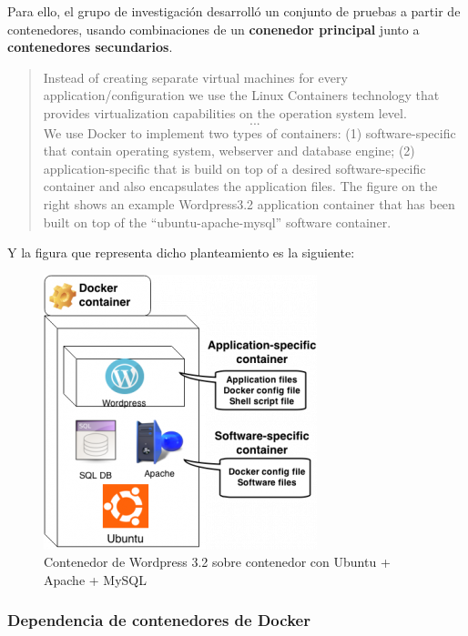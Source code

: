             Para ello, el grupo de investigación desarrolló un conjunto de pruebas a partir de contenedores, usando combinaciones de un \textbf{conenedor principal} junto a \textbf{contenedores secundarios}.

            \begin{quote}

                Instead of creating separate virtual machines for every application/configuration we use the Linux Containers technology that provides virtualization capabilities on the operation system level. \[...\] We use Docker to implement two types of containers: (1) software-specific that contain operating system, webserver and database engine; (2) application-specific that is build on top of a desired software-specific container and also encapsulates the application files. The figure on the right shows an example Wordpress3.2 application container that has been built on top of the “ubuntu-apache-mysql” software container.

            \end{quote}

            Y la figura que representa dicho planteamiento es la siguiente:

            \begin{figure}[htbp]
                \centering

                \includegraphics[scale=0.75]{images/Diagramas/Articulo.png}

                \caption{Contenedor de Wordpress 3.2 sobre contenedor con Ubuntu + Apache + MySQL}
                \label{fig:articulo}
            \end{figure}

            \newpage
                
            \subsubsection{Dependencia de contenedores de Docker}

